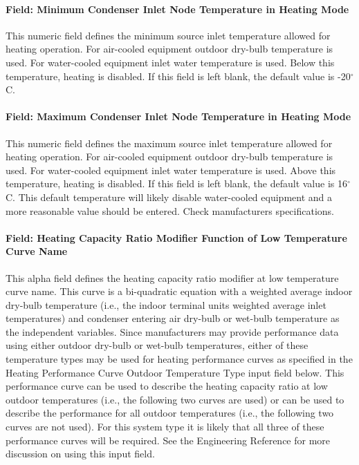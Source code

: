 \paragraph{Field: Minimum Condenser Inlet Node Temperature in Heating Mode}\label{field-minimum-condenser-inlet-node-temperature-in-heating-mode-000}

This numeric field defines the minimum source inlet temperature allowed for heating operation. For air-cooled equipment outdoor dry-bulb temperature is used. For water-cooled equipment inlet water temperature is used. Below this temperature, heating is disabled. If this field is left blank, the default value is -20$^\circ$C.

\paragraph{Field: Maximum Condenser Inlet Node Temperature in Heating Mode}\label{field-maximum-condenser-inlet-node-temperature-in-heating-mode-000}

This numeric field defines the maximum source inlet temperature allowed for heating operation. For air-cooled equipment outdoor dry-bulb temperature is used. For water-cooled equipment inlet water temperature is used. Above this temperature, heating is disabled. If this field is left blank, the default value is 16$^\circ$C. This default temperature will likely disable water-cooled equipment and a more reasonable value should be entered.  Check manufacturers specifications.

\paragraph{Field: Heating Capacity Ratio Modifier Function of Low Temperature Curve Name}\label{field-heating-capacity-ratio-modifier-function-of-low-temperature-curve-name}

This alpha field defines the heating capacity ratio modifier at low temperature curve name. This curve is a bi-quadratic equation with a weighted average indoor dry-bulb temperature (i.e., the indoor terminal units weighted average inlet temperatures) and condenser entering air dry-bulb or wet-bulb temperature as the independent variables. Since manufacturers may provide performance data using either outdoor dry-bulb or wet-bulb temperatures, either of these temperature types may be used for heating performance curves as specified in the Heating Performance Curve Outdoor Temperature Type input field below. This performance curve can be used to describe the heating capacity ratio at low outdoor temperatures (i.e., the following two curves are used) or can be used to describe the performance for all outdoor temperatures (i.e., the following two curves are not used). For this system type it is likely that all three of these performance curves will be required. See the Engineering Reference for more discussion on using this input field.

